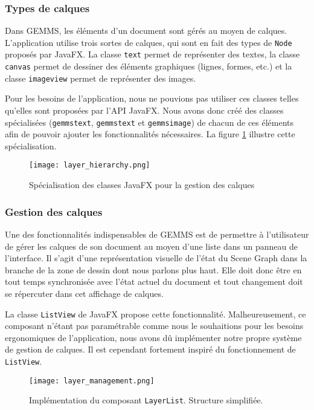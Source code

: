 \subsubsection{Types de calques}
Dans GEMMS, les éléments d'un document sont gérés au moyen de calques. L'application utilise trois sortes de calques, qui sont en fait des types de \texttt{Node} proposés par JavaFX. La classe \texttt{\gls{text}} permet de représenter des textes, la classe \texttt{\gls{canvas}} permet de dessiner des éléments graphiques (lignes, formes, etc.) et la classe \texttt{\gls{imageview}} permet de représenter des images. 

Pour les besoins de l'application, nous ne pouvions pas utiliser ces classes telles qu'elles sont proposées par l'API JavaFX. Nous avons donc créé des classes spécialisées (\texttt{\gls{gemmstext}}, \texttt{\gls{gemmstext}} et  \texttt{\gls{gemmsimage}}) de chacun de ces éléments afin de pouvoir ajouter les fonctionnalités nécessaires. La figure \ref{fig:layer_hierarchy} illustre cette spécialisation.

\begin{figure}[!ht]
	\caption{Spécialisation des classes JavaFX pour la gestion des calques}
	\centering
	\texttt{[image: layer\_hierarchy.png]}
	\label{fig:layer_hierarchy}
\end{figure}


\subsubsection{Gestion des calques}

Une des fonctionnalités indispensables de GEMMS est de permettre à l'utilisateur de gérer les calques de son document au moyen d'une liste dans un panneau de l'interface. Il s'agit d'une représentation visuelle de l'état du Scene Graph dans la branche de la zone de dessin dont nous parlons plus haut. Elle doit donc être en tout temps synchronisée avec l'état actuel du document et tout changement doit se répercuter dans cet affichage de calques.

La classe \texttt{ListView} de JavaFX propose cette fonctionnalité. Malheureusement, ce composant n'étant pas paramétrable comme nous le souhaitions pour les besoins ergonomiques de l'application, nous avons dû implémenter notre propre système de gestion de calques. Il est cependant fortement inspiré du fonctionnement de \texttt{ListView}.

\begin{figure}[!ht]
	\caption{Implémentation du composant \texttt{LayerList}. Structure simplifiée.}
	\centering
	\texttt{[image: layer\_management.png]}
	\label{fig:layer_management}
\end{figure}

